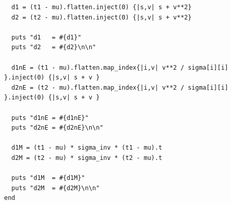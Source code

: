 \documentclass[11pt,twocolumn]{amsart} %
\begin{document}
\begin{verbatim}
  d1 = (t1 - mu).flatten.inject(0) {|s,v| s + v**2} 
  d2 = (t2 - mu).flatten.inject(0) {|s,v| s + v**2}

  puts "d1   = #{d1}"
  puts "d2   = #{d2}\n\n"

  d1nE = (t1 - mu).flatten.map_index{|i,v| v**2 / sigma[i][i] }.inject(0) {|s,v| s + v } 
  d2nE = (t2 - mu).flatten.map_index{|i,v| v**2 / sigma[i][i] }.inject(0) {|s,v| s + v } 

  puts "d1nE = #{d1nE}"
  puts "d2nE = #{d2nE}\n\n"

  d1M = (t1 - mu) * sigma_inv * (t1 - mu).t
  d2M = (t2 - mu) * sigma_inv * (t2 - mu).t

  puts "d1M  = #{d1M}"
  puts "d2M  = #{d2M}\n\n"
end
\end{verbatim}
\end{document}

